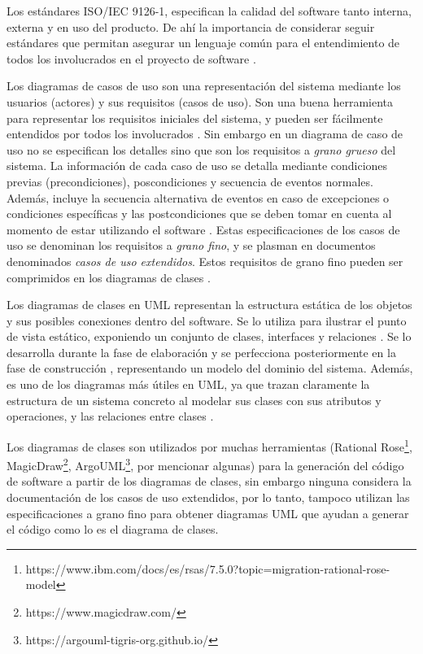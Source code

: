 Los estándares ISO/IEC 9126-1, especifican la calidad del software tanto interna, externa y en uso del producto. De ahí la importancia de considerar seguir estándares que permitan asegurar un lenguaje común para el entendimiento de todos los involucrados en el proyecto de software \parencite{Losavio2009}.

Los diagramas de casos de uso son una representación del sistema mediante los usuarios (actores) y sus requisitos (casos de uso). Son una buena herramienta para representar los requisitos iniciales del sistema, y pueden ser fácilmente entendidos por todos los involucrados \parencite{Zapata2008}. Sin embargo en un diagrama de caso de uso no se especifican los detalles sino que son los requisitos a \textit{grano grueso} del sistema. La información de cada caso de uso se detalla mediante condiciones previas (precondiciones), poscondiciones y secuencia de eventos normales. Además, incluye la secuencia alternativa de eventos en caso de excepciones o condiciones específicas y las postcondiciones que se deben tomar en cuenta al momento de estar utilizando el software \parencite{iqbal2020}. Estas especificaciones de los casos de uso se denominan los requisitos a \textit{grano fino}, y se plasman en documentos denominados \textit{casos de uso extendidos}. Estos requisitos de grano fino pueden ser comprimidos en los diagramas de clases \parencite{Abdelnabi2021}. 

Los diagramas de clases en UML representan la estructura estática de los objetos y sus posibles conexiones dentro del software. Se lo utiliza para ilustrar el punto de vista estático, exponiendo un conjunto de clases, interfaces y relaciones \parencite{abu2020}. Se lo desarrolla durante la fase de elaboración y se perfecciona posteriormente en la fase de construcción \parencite{Omg2009}, representando un modelo del dominio del sistema. Además, es uno de los diagramas más útiles en UML, ya que trazan claramente la estructura de un sistema concreto al modelar sus clases con sus atributos y operaciones, y las relaciones entre clases \parencite{abu2020}.

Los diagramas de clases son utilizados por muchas herramientas (Rational Rose\footnote{https://www.ibm.com/docs/es/rsas/7.5.0?topic=migration-rational-rose-model}, MagicDraw\footnote{https://www.magicdraw.com/}, ArgoUML\footnote{https://argouml-tigris-org.github.io/}, por mencionar algunas) para la generación del código de software a partir de los diagramas de clases, sin embargo ninguna considera la documentación de los casos de uso extendidos, por lo tanto, tampoco utilizan las especificaciones a grano fino para obtener diagramas UML que ayudan a generar el código como lo es el diagrama de clases.

